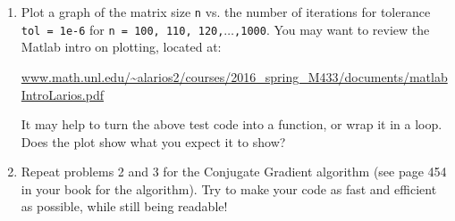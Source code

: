 \documentclass[12pt]{article}
\theoremstyle{plain}
\theoremstyle{definition}
\theoremstyle{remark}
\numberwithin{equation}{section} %
\numberwithin{figure}{section}   %
\begin{document}
\begin{enumerate}
\item Plot a graph of the matrix size \texttt{n} vs. the number of iterations for tolerance \texttt{tol = 1e-6} for \texttt{n = 100, 110, 120,}$\ldots$\texttt{,1000}.  You may want to review the Matlab intro on plotting, located at:

\begin{minipage}[h]{9in}
\hspace{-1in}\url{www.math.unl.edu/~alarios2/courses/2016_spring_M433/documents/matlabIntroLarios.pdf}
\end{minipage}

It may help to turn the above test code into a function, or wrap it in a loop.  Does the plot show what you expect it to show?  

\item Repeat problems 2 and 3 for the Conjugate Gradient algorithm (see page 454 in your book for the algorithm).  Try to make your code as fast and efficient as possible, while still being readable!

\vspace{1in}





\end{enumerate}
\end{document}
